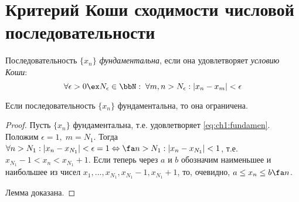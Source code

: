 \section{Критерий Коши сходимости числовой последовательности}

\begin{defn}
Последовательность $\{x_n\}$ \textit{фундаментальна}, если она удовлетворяет \textit{условию Коши}:
\begin{equation}
\label{eq:ch1:fundamen}
\forall \epsilon >0 \ex N_{\epsilon} \in \bbN: \;\forall m,n > N_{\epsilon}: |x_n-x_m|<\epsilon  
\end{equation}
\end{defn}

\begin{lemm}
\label{lm:ch1:fundamendal}
Если последовательность $\{x_n\}$ фундаментальна, то она ограничена.
\end{lemm}
\begin{proof}
Пусть $\{x_n\}$ фундаментальна, т.е. удовлетворяет \eqref{eq:ch1:fundamen}. Положим $\epsilon = 1,\; m = N_1$. Тогда $\forall n > N_1:\\ |x_n-x_{N_1}| <\epsilon = 1 \Leftrightarrow \fa n > N_1: |x_n - x_{N_1}| < 1$, т.е. $x_{N_1} - 1< x_n < x_{N_1}+1$. Если теперь через $a$ и $b$ обозначим наименьшее и наибольшее из чисел $x_1,\dots,x_{N_1},x_{N_1}-1,x_{N_1}+1$, то, очевидно, $a \le x_n \le b \fa n$.

Лемма доказана.
\end{proof}

